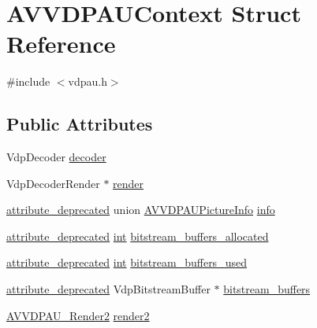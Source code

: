 \hypertarget{struct_a_v_v_d_p_a_u_context}{}\section{A\+V\+V\+D\+P\+A\+U\+Context Struct Reference}
\label{struct_a_v_v_d_p_a_u_context}


{\ttfamily \#include $<$vdpau.\+h$>$}

\subsection*{Public Attributes}
\begin{DoxyCompactItemize}
\item 
Vdp\+Decoder \hyperlink{struct_a_v_v_d_p_a_u_context_a54b51de52e8b936c93272cad8e94e395}{decoder}
\item 
Vdp\+Decoder\+Render $\ast$ \hyperlink{struct_a_v_v_d_p_a_u_context_ac007e73409f8171d5aa26c2c1b72454c}{render}
\item 
\hyperlink{attributes_8h_aa6d076561d3a9eea4729ee632652de02}{attribute\+\_\+deprecated} union \hyperlink{union_a_v_v_d_p_a_u_picture_info}{A\+V\+V\+D\+P\+A\+U\+Picture\+Info} \hyperlink{struct_a_v_v_d_p_a_u_context_af2826dbf7db72ddae2376372db67bd82}{info}
\item 
\hyperlink{attributes_8h_aa6d076561d3a9eea4729ee632652de02}{attribute\+\_\+deprecated} \hyperlink{xmltok_8h_a5a0d4a5641ce434f1d23533f2b2e6653}{int} \hyperlink{struct_a_v_v_d_p_a_u_context_a4dcbc0fe3aa59529a032d63777e00b4a}{bitstream\+\_\+buffers\+\_\+allocated}
\item 
\hyperlink{attributes_8h_aa6d076561d3a9eea4729ee632652de02}{attribute\+\_\+deprecated} \hyperlink{xmltok_8h_a5a0d4a5641ce434f1d23533f2b2e6653}{int} \hyperlink{struct_a_v_v_d_p_a_u_context_a9116d89dbc37270ff70579b1e9411069}{bitstream\+\_\+buffers\+\_\+used}
\item 
\hyperlink{attributes_8h_aa6d076561d3a9eea4729ee632652de02}{attribute\+\_\+deprecated} Vdp\+Bitstream\+Buffer $\ast$ \hyperlink{struct_a_v_v_d_p_a_u_context_a669a2d63ad020507d8327df13a075cd2}{bitstream\+\_\+buffers}
\item 
\hyperlink{group__lavc__codec__hwaccel__vdpau_ga1f243045ef2673ebe2a50a8431f3dfa7}{A\+V\+V\+D\+P\+A\+U\+\_\+\+Render2} \hyperlink{struct_a_v_v_d_p_a_u_context_af220e2bf6c0093dd63c8384dccccd3d8}{render2}
\end{DoxyCompactItemize}


